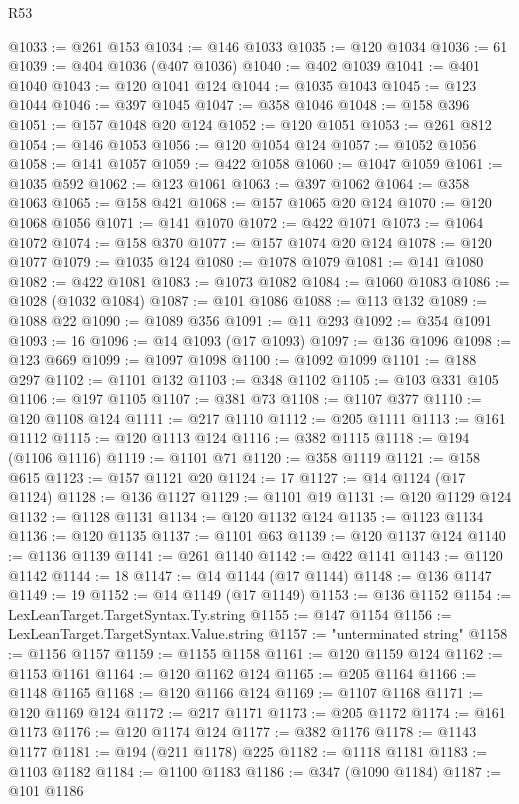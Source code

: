 \begin{lexlean}{R53}
\begin{coremodule}
@1033 := @261 @153
@1034 := @146 @1033
@1035 := @120 @1034
@1036 := 61
@1039 := @404 @1036 (@407 @1036)
@1040 := @402 @1039
@1041 := @401 @1040
@1043 := @120 @1041 @124
@1044 := @1035 @1043
@1045 := @123 @1044
@1046 := @397 @1045
@1047 := @358 @1046
@1048 := @158 @396
@1051 := @157 @1048 @20 @124
@1052 := @120 @1051
@1053 := @261 @812
@1054 := @146 @1053
@1056 := @120 @1054 @124
@1057 := @1052 @1056
@1058 := @141 @1057
@1059 := @422 @1058
@1060 := @1047 @1059
@1061 := @1035 @592
@1062 := @123 @1061
@1063 := @397 @1062
@1064 := @358 @1063
@1065 := @158 @421
@1068 := @157 @1065 @20 @124
@1070 := @120 @1068 @1056
@1071 := @141 @1070
@1072 := @422 @1071
@1073 := @1064 @1072
@1074 := @158 @370
@1077 := @157 @1074 @20 @124
@1078 := @120 @1077
@1079 := @1035 @124
@1080 := @1078 @1079
@1081 := @141 @1080
@1082 := @422 @1081
@1083 := @1073 @1082
@1084 := @1060 @1083
@1086 := @1028 (@1032 @1084)
@1087 := @101 @1086
@1088 := @113 @132
@1089 := @1088 @22
@1090 := @1089 @356
@1091 := @11 @293
@1092 := @354 @1091
@1093 := 16
@1096 := @14 @1093 (@17 @1093)
@1097 := @136 @1096
@1098 := @123 @669
@1099 := @1097 @1098
@1100 := @1092 @1099
@1101 := @188 @297
@1102 := @1101 @132
@1103 := @348 @1102
@1105 := @103 @331 @105
@1106 := @197 @1105
@1107 := @381 @73
@1108 := @1107 @377
@1110 := @120 @1108 @124
@1111 := @217 @1110
@1112 := @205 @1111
@1113 := @161 @1112
@1115 := @120 @1113 @124
@1116 := @382 @1115
@1118 := @194 (@1106 @1116)
@1119 := @1101 @71
@1120 := @358 @1119
@1121 := @158 @615
@1123 := @157 @1121 @20
@1124 := 17
@1127 := @14 @1124 (@17 @1124)
@1128 := @136 @1127
@1129 := @1101 @19
@1131 := @120 @1129 @124
@1132 := @1128 @1131
@1134 := @120 @1132 @124
@1135 := @1123 @1134
@1136 := @120 @1135
@1137 := @1101 @63
@1139 := @120 @1137 @124
@1140 := @1136 @1139
@1141 := @261 @1140
@1142 := @422 @1141
@1143 := @1120 @1142
@1144 := 18
@1147 := @14 @1144 (@17 @1144)
@1148 := @136 @1147
@1149 := 19
@1152 := @14 @1149 (@17 @1149)
@1153 := @136 @1152
@1154 := LexLeanTarget.TargetSyntax.Ty.string
@1155 := @147 @1154
@1156 := LexLeanTarget.TargetSyntax.Value.string
@1157 := "unterminated string"
@1158 := @1156 @1157
@1159 := @1155 @1158
@1161 := @120 @1159 @124
@1162 := @1153 @1161
@1164 := @120 @1162 @124
@1165 := @205 @1164
@1166 := @1148 @1165
@1168 := @120 @1166 @124
@1169 := @1107 @1168
@1171 := @120 @1169 @124
@1172 := @217 @1171
@1173 := @205 @1172
@1174 := @161 @1173
@1176 := @120 @1174 @124
@1177 := @382 @1176
@1178 := @1143 @1177
@1181 := @194 (@211 @1178) @225
@1182 := @1118 @1181
@1183 := @1103 @1182
@1184 := @1100 @1183
@1186 := @347 (@1090 @1184)
@1187 := @101 @1186

\end{coremodule}
\end{lexlean}
